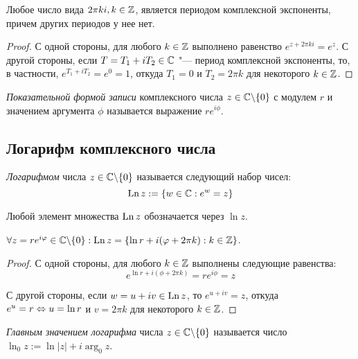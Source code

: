 \begin{proposition}
	Любое число вида $2\pi k i, k \in \mathbb{Z}$, является периодом комплексной экспоненты, причем других периодов у нее нет.
\end{proposition}

\begin{proof}
	С одной стороны, для любого $k \in \mathbb{Z}$ выполнено равенство $e^{z + 2\pi ki} = e^z$. С другой стороны, если $T = T_1 + iT_2 \in \mathbb{C}$ "--- период комплексной экспоненты, то, в частности, $e^{T_1 + iT_2} = e^0 = 1$, откуда $T_1 = 0$ и $T_2 = 2\pi k$ для некоторого $k \in \mathbb{Z}$.
\end{proof}

\begin{definition}
	\textit{Показательной формой записи} комплексного числа $z \in \mathbb{C} \backslash \{0\}$ с модулем $r$ и значением аргумента $\phi$ называется выражение $re^{i\phi}$.
\end{definition}

\subsection{Логарифм комплексного числа}

\begin{definition}
	\textit{Логарифмом} числа $z \in \mathbb{C} \backslash \{0\}$ называется следующий набор чисел:
	\[\operatorname{Ln}{z} := \left\{w \in \mathbb{C} : e^w = z\right\}\]
	
	Любой элемент множества $\operatorname{Ln}{z}$ обозначается через $\ln{z}$.
\end{definition}

\begin{proposition}
	$\forall z = re^{i\varphi} \in \mathbb{C} \backslash \{0\} : \operatorname{Ln}{z} = \{ \ln{r} + i(\varphi + 2\pi k) : k \in \mathbb{Z}\}$.
\end{proposition}

\begin{proof}
	С одной стороны, для любого $k \in \mathbb{Z}$ выполнены следующие равенства: \[e^{\ln{r} + i(\phi + 2\pi k)} = re^{i\phi} = z\]
	
	С другой стороны, если $w = u + iv \in \operatorname{Ln}{z}$, то $e^{u + iv} = z$, откуда $e^u = r \Leftrightarrow u = \ln{r}$ и $v = 2\pi k$ для некоторого $k \in \mathbb{Z}$.
\end{proof}

\begin{definition}
	\textit{Главным значением логарифма} числа $z \in \mathbb{C} \backslash \{0\}$ называется число $\ln_0{z} := \ln|z| + i\arg_0{z}$.
\end{definition}


